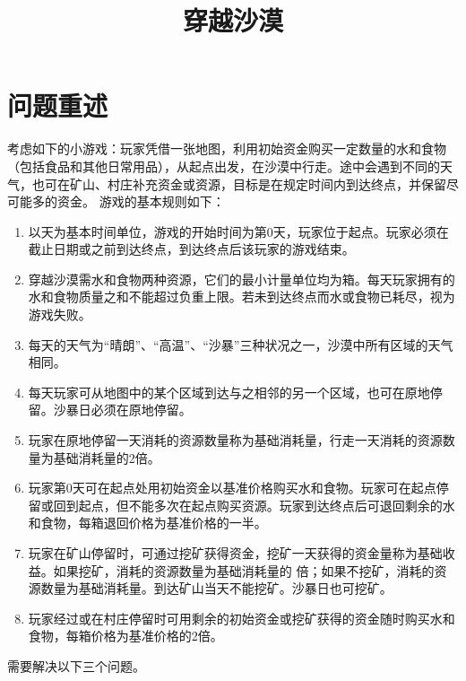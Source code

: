 \documentclass[withoutpre]{cumcmthesis} %
\title{穿越沙漠}
\begin{document}
 \maketitle
 \begin{abstract}


\end{abstract}



\section{问题重述}
考虑如下的小游戏：玩家凭借一张地图，利用初始资金购买一定数量的水和食物（包括食品和其他日常用品），从起点出发，在沙漠中行走。途中会遇到不同的天气，也可在矿山、村庄补充资金或资源，目标是在规定时间内到达终点，并保留尽可能多的资金。
游戏的基本规则如下：
\begin{enumerate}
    \item 以天为基本时间单位，游戏的开始时间为第0天，玩家位于起点。玩家必须在截止日期或之前到达终点，到达终点后该玩家的游戏结束。
    \item 穿越沙漠需水和食物两种资源，它们的最小计量单位均为箱。每天玩家拥有的水和食物质量之和不能超过负重上限。若未到达终点而水或食物已耗尽，视为游戏失败。
    \item 每天的天气为“晴朗”、“高温”、“沙暴”三种状况之一，沙漠中所有区域的天气相同。
    \item 每天玩家可从地图中的某个区域到达与之相邻的另一个区域，也可在原地停留。沙暴日必须在原地停留。
    \item 玩家在原地停留一天消耗的资源数量称为基础消耗量，行走一天消耗的资源数量为基础消耗量的2倍。
    \item 玩家第0天可在起点处用初始资金以基准价格购买水和食物。玩家可在起点停留或回到起点，但不能多次在起点购买资源。玩家到达终点后可退回剩余的水和食物，每箱退回价格为基准价格的一半。
    \item 玩家在矿山停留时，可通过挖矿获得资金，挖矿一天获得的资金量称为基础收益。如果挖矿，消耗的资源数量为基础消耗量的 倍；如果不挖矿，消耗的资源数量为基础消耗量。到达矿山当天不能挖矿。沙暴日也可挖矿。
    \item 玩家经过或在村庄停留时可用剩余的初始资金或挖矿获得的资金随时购买水和食物，每箱价格为基准价格的2倍。
\end{enumerate}
    需要解决以下三个问题。
\end{document}
